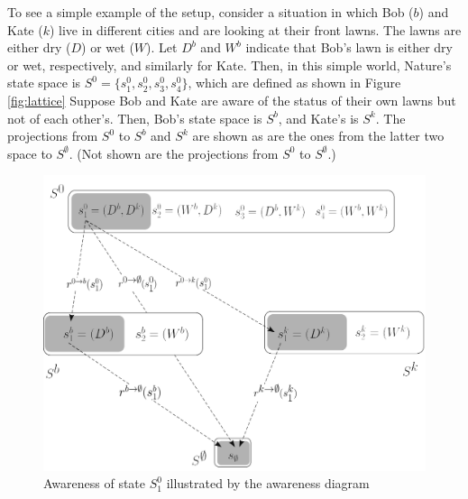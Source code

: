 \documentclass[
11pt,
titlepage,
reqno,
]{article}%
\theoremstyle{definition}
\begin{document}
To see a simple example of the setup, consider a situation in which  Bob ($b$) and Kate ($k$) live in different cities and are looking at their front lawns. 
The lawns are either dry ($D$) or wet ($W$).
Let $D^b$ and $W^b$ indicate that Bob's lawn is either dry or wet, respectively, and similarly for Kate. 
Then, in this simple world, Nature's state space is $S^0=\{s^0_1,s^0_2,s^0_3,s^0_4\}$, which are defined as shown in Figure \ref{fig:lattice}
Suppose Bob and Kate are aware of the status of their own lawns but not of each other's.
Then, Bob's state space is $S^b$, and Kate's is $S^k$.
The projections from $S^0$ to $S^b$ and $S^k$ are shown as are the ones from the latter two space to $S^\emptyset$.
(Not shown are the projections from $S^0$ to $S^\emptyset$.)

\begin{figure}[h!]	
	\begin{center}
		\includegraphics[scale=.4]{lattice-state.png}
	\end{center}
\caption{Awareness of state $S^0_1$ illustrated by the awareness diagram \label{fig:lattice-state}}
\end{figure}
\end{document}
